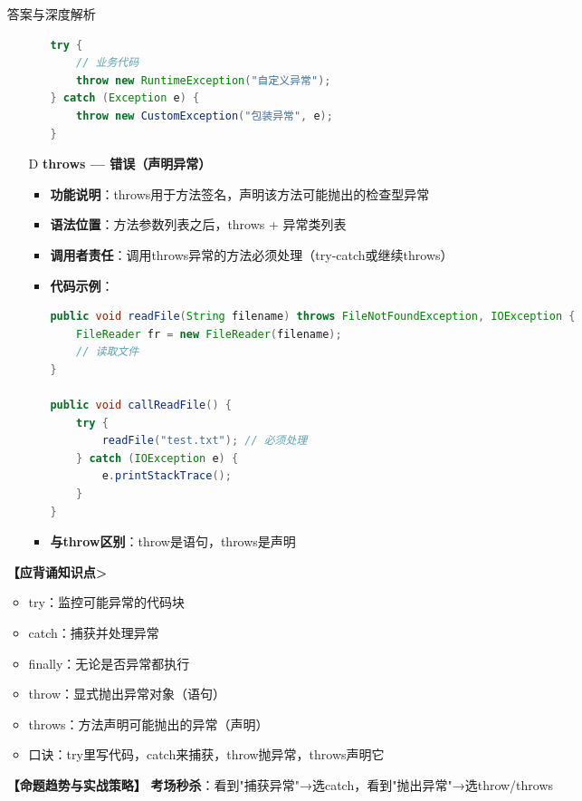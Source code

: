 \documentclass[12pt, a4paper]{ctexart}
\begin{document}
\begin{enumerate}[label=\textbf{\arabic*.}]
\begin{bluebox}{答案与深度解析}
\begin{itemize}[leftmargin=*, nosep, label={}]
\begin{itemize}[label={}, leftmargin=*, nosep]
\begin{lstlisting}[language=Java]
try {
    // 业务代码
    throw new RuntimeException("自定义异常");
} catch (Exception e) {
    throw new CustomException("包装异常", e);
}
				            \end{lstlisting}
			            \end{itemize}

			      \item[D] \textbf{throws — 错误（声明异常）}
			            \begin{itemize}[label={}, leftmargin=*, nosep]
				            \item \textbf{功能说明}：throws用于方法签名，声明该方法可能抛出的检查型异常
				            \item \textbf{语法位置}：方法参数列表之后，throws + 异常类列表
				            \item \textbf{调用者责任}：调用throws异常的方法必须处理（try-catch或继续throws）
				            \item \textbf{代码示例}：
				                  \begin{lstlisting}[language=Java]
public void readFile(String filename) throws FileNotFoundException, IOException {
    FileReader fr = new FileReader(filename);
    // 读取文件
}

public void callReadFile() {
    try {
        readFile("test.txt"); // 必须处理
    } catch (IOException e) {
        e.printStackTrace();
    }
}
				            \end{lstlisting}
				            \item \textbf{与throw区别}：throw是语句，throws是声明
			            \end{itemize}
		      \end{itemize}

		      \textbf{【应背诵知识点>}
		      \begin{itemize}[label={}, nosep]
			      \item try：监控可能异常的代码块
			      \item catch：捕获并处理异常
			      \item finally：无论是否异常都执行
			      \item throw：显式抛出异常对象（语句）
			      \item throws：方法声明可能抛出的异常（声明）
			      \item 口诀：try里写代码，catch来捕获，throw抛异常，throws声明它
		      \end{itemize}

		      \textbf{【命题趋势与实战策略】}
		      \textbf{考场秒杀}：看到"捕获异常"→选catch，看到"抛出异常"→选throw/throws
	      \end{bluebox}


\end{enumerate}
\end{document}
